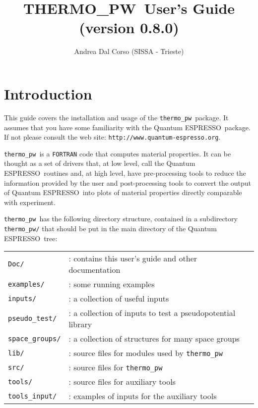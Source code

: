 \documentclass[12pt,a4paper]{article}
\def\version{0.8.0}
\def\qe{{\sc Quantum ESPRESSO}}
\def\tpw{{\sc THERMO\_PW}}
\def\thermo{\texttt{thermo\_pw}}
\begin{document}
 
\author{Andrea Dal Corso (SISSA - Trieste)}
\date{}


\title{
  \vskip 1cm
  {\color{red} \Huge \tpw\ User's Guide} \\
  \Large (version \version)
}

\maketitle

\tableofcontents

\newpage

\section{\color{coral}Introduction}

This guide covers the installation and usage of the \thermo\ package. 
It assumes that you have some familiarity with the \qe\ package. 
If not please consult the web site: \texttt{http://www.quantum-espresso.org}.

\thermo\ is a \texttt{FORTRAN} code that computes material properties.
It can be thought as a set of drivers that,
at low level, call the \qe\ routines and, at high level, have pre-processing
tools to reduce the information provided by the user and
post-processing tools to convert the output of \qe\ into plots of material 
properties directly comparable with experiment.

\thermo\ has the following directory structure, contained in a subdirectory 
\texttt{thermo\_pw/} that should be put in the main directory of the \qe\ tree:

\begin{tabular}{ll}
\texttt{Doc/}      & : contains this user's guide and other documentation\\
\texttt{examples/} & : some running examples \\
\texttt{inputs/}   & : a collection of useful inputs \\
\texttt{pseudo\_test/} & : a collection of inputs to test a pseudopotential library\\
\texttt{space\_groups/} & : a collection of structures for many space groups \\
\texttt{lib/}      & : source files for modules used by \thermo\ \\
\texttt{src/}      & : source files for \thermo\ \\
\texttt{tools/}    & : source files for auxiliary tools \\
\texttt{tools\_input/}  & : examples of inputs for the auxiliary tools \\
\end{tabular}\\
\end{document}
